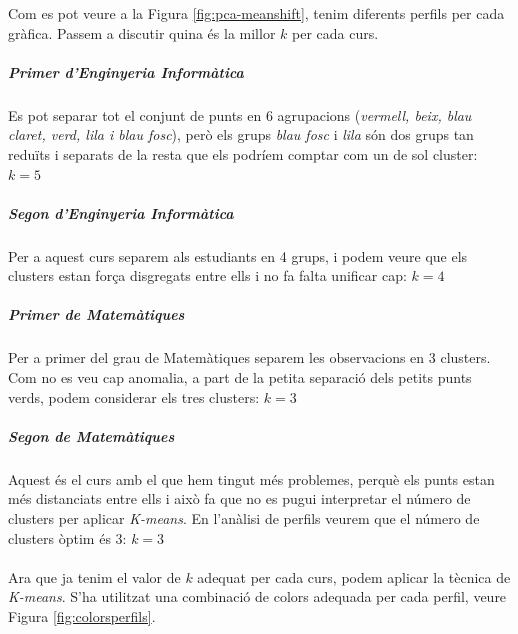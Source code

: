 \documentclass[12pt,a4paper,catalan]{article}
\begin{document}
Com es pot veure a la Figura \ref{fig:pca-meanshift}, tenim diferents perfils per cada gràfica. Passem a discutir quina és la millor $k$ per cada curs.

\subparagraph{Primer d'Enginyeria Informàtica}
Es pot separar tot el conjunt de punts en 6 agrupacions (\textit{vermell, beix, blau claret, verd, lila i blau fosc}), però els grups \textit{blau fosc} i \textit{lila} són dos grups tan reduïts i separats de la resta que els podríem comptar com un de sol cluster: $k=5$

\subparagraph{Segon d'Enginyeria Informàtica}
Per a aquest curs separem als estudiants en 4 grups, i podem veure que els clusters estan força disgregats entre ells i no fa falta unificar cap:  $k=4$

\subparagraph{Primer de Matemàtiques} 
Per a primer del grau de Matemàtiques separem les observacions en 3 clusters. Com no es veu cap anomalia, a part de la petita separació dels petits punts verds, podem considerar els tres clusters:  $k=3$

\subparagraph{Segon de Matemàtiques}
Aquest és el curs amb el que hem tingut més problemes, perquè els punts estan més distanciats entre ells i això fa que no es pugui interpretar el número de clusters per aplicar \textit{K-means}. En l'anàlisi de perfils veurem que el número de clusters òptim és 3: $k=3$
\\
\\
Ara que ja tenim el valor de $k$ adequat per cada curs, podem aplicar la tècnica de \textit{K-means}. S'ha utilitzat una combinació de colors adequada per cada perfil, veure Figura \ref{fig:colorsperfils}.
\end{document}
